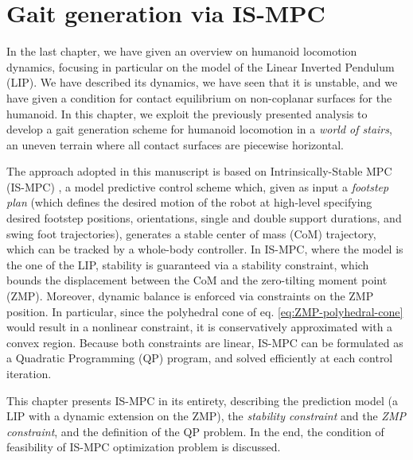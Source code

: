 \chapter{Gait generation via IS-MPC}
\label{ch:ISMPC}
In the last chapter, we have given an overview on humanoid locomotion dynamics,
focusing in particular on the model of the Linear Inverted Pendulum (LIP). We have
described its dynamics, we have seen that it is unstable, and we have given a
condition for contact equilibrium on non-coplanar surfaces for the humanoid.
In this chapter, we exploit the previously
presented analysis to develop a gait generation scheme for humanoid locomotion
in a \textit{world of stairs}, an uneven terrain where all contact surfaces 
are piecewise horizontal.

The approach adopted in this manuscript is based on
Intrinsically-Stable MPC (IS-MPC) \cite{Scianca2020TRO},
a model predictive control scheme which, given as input a \textit{footstep plan}
(which defines the desired motion of the robot at high-level specifying desired
footstep positions, orientations, single and double support durations, and swing
foot trajectories), generates
a stable center of mass (CoM) trajectory, which can be tracked by a whole-body
controller. In IS-MPC, where the model is the one of the LIP, stability is
guaranteed via a stability constraint, which
bounds the displacement between the CoM and the zero-tilting moment point (ZMP).
Moreover, dynamic balance is enforced via constraints on the ZMP
position. In particular, since the polyhedral cone of eq.
\eqref{eq:ZMP-polyhedral-cone} would result in a nonlinear constraint, it is
conservatively approximated with a convex region. Because both constraints are 
linear, IS-MPC can be formulated as a Quadratic Programming (QP) program, and 
solved efficiently at each control iteration.

This chapter presents IS-MPC in its entirety, describing the prediction model (a LIP with a 
dynamic extension on the ZMP), the \textit{stability constraint} and the \textit{ZMP constraint}, and the
definition of the QP problem. In the end, the condition of feasibility of IS-MPC
optimization problem is discussed.

